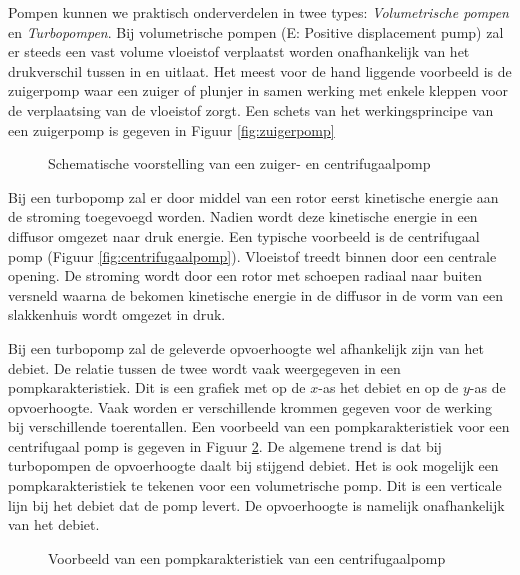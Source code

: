 Pompen kunnen we praktisch onderverdelen in twee types: \emph{Volumetrische pompen} en \emph{Turbopompen}. Bij volumetrische pompen (E: Positive displacement pump) zal er steeds een vast volume vloeistof verplaatst worden onafhankelijk van het drukverschil tussen in en uitlaat. Het meest voor de hand liggende voorbeeld is de zuigerpomp waar een zuiger of plunjer in samen werking met enkele kleppen voor de verplaatsing van de vloeistof zorgt. Een schets van het werkingsprincipe van een zuigerpomp is gegeven in Figuur \ref{fig:zuigerpomp} 
\begin{figure}
	\centering
	\subfigure[Zuigerpomp]{
		
		\label{fig:zuigerpomp}
	} \quad
	\subfigure[Centrifugaalpomp]{
		
		\label{fig:centrifugaalpomp}
	}	
	\caption{Schematische voorstelling van een zuiger- en centrifugaalpomp}
	\label{fig:pompen}
\end{figure}

Bij een turbopomp zal er door middel van een rotor eerst kinetische energie aan de stroming toegevoegd worden. Nadien wordt deze kinetische energie in een diffusor omgezet naar druk energie. Een typische voorbeeld is de centrifugaal pomp (Figuur \ref{fig:centrifugaalpomp}). Vloeistof treedt binnen door een centrale opening. De stroming wordt door een rotor met schoepen radiaal naar buiten versneld waarna de bekomen kinetische energie in de diffusor in de vorm van een slakkenhuis wordt omgezet in druk.

Bij een turbopomp zal de geleverde opvoerhoogte wel afhankelijk zijn van het debiet. De relatie tussen de twee wordt vaak weergegeven in een pompkarakteristiek. Dit is een grafiek met op de $x$-as het debiet en op de $y$-as de opvoerhoogte. Vaak worden er verschillende krommen gegeven voor de werking bij verschillende toerentallen. Een voorbeeld van een pompkarakteristiek voor een centrifugaal pomp is gegeven in Figuur \ref{fig:Pompkarakteristiek}. De algemene trend is dat bij turbopompen de opvoerhoogte daalt bij stijgend debiet. Het is ook mogelijk een pompkarakteristiek te tekenen voor een volumetrische pomp. Dit is een verticale lijn bij het debiet dat de pomp levert. De opvoerhoogte is namelijk onafhankelijk van het debiet.
\begin{figure}
	\centering
	
	\caption{Voorbeeld van een pompkarakteristiek van een centrifugaalpomp}
	\label{fig:Pompkarakteristiek}
\end{figure}

